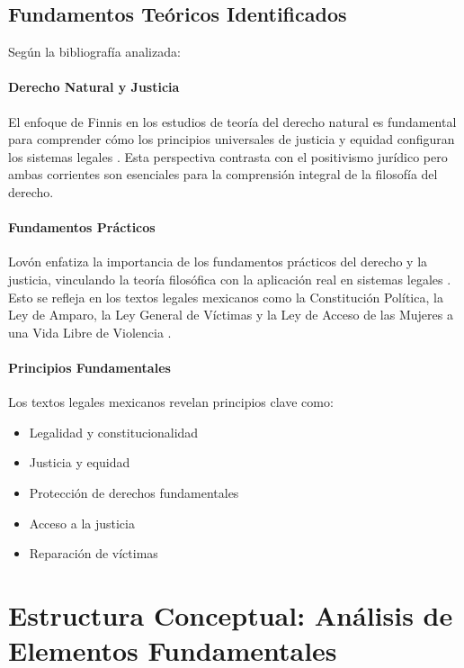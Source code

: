 \documentclass[
	spanish, %
	letterpaper, oneside
]{article}
\begin{document}
\subsection{Fundamentos Teóricos Identificados}

Según la bibliografía analizada:

\paragraph{Derecho Natural y Justicia}
El enfoque de Finnis en los estudios de teoría del derecho natural es fundamental para comprender cómo los principios universales de justicia y equidad configuran los sistemas legales \cite{finnis_estudios_2017}. Esta perspectiva contrasta con el positivismo jurídico pero ambas corrientes son esenciales para la comprensión integral de la filosofía del derecho.

\paragraph{Fundamentos Prácticos}
Lovón enfatiza la importancia de los fundamentos prácticos del derecho y la justicia, vinculando la teoría filosófica con la aplicación real en sistemas legales \cite{lovon_manual_2020}. Esto se refleja en los textos legales mexicanos como la Constitución Política, la Ley de Amparo, la Ley General de Víctimas y la Ley de Acceso de las Mujeres a una Vida Libre de Violencia \cite{noauthor_constitucion_nodate,generales_ley_2021,de_victimas_ley_2013,franzoni_acevedo_ley_2017}.

\paragraph{Principios Fundamentales}
Los textos legales mexicanos revelan principios clave como:
\begin{itemize}
	\item Legalidad y constitucionalidad
	\item Justicia y equidad
	\item Protección de derechos fundamentales
	\item Acceso a la justicia
	\item Reparación de víctimas
\end{itemize}

\section{Estructura Conceptual: Análisis de Elementos Fundamentales}
\end{document}
